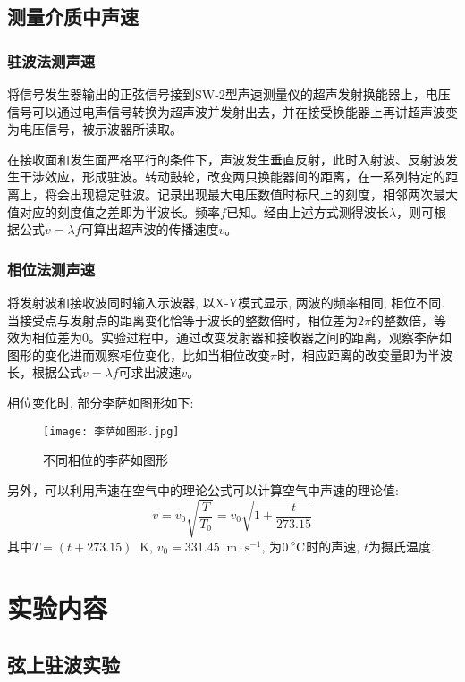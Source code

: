 \documentclass[11pt]{article}
\newcommand*{\unit}[1]{\mathop{}\!\mathrm{#1}}
\newcommand*{\mcelsius}{\unit{\prescript{\circ}{}C}}
\begin{document}
\subsection{测量介质中声速}

\subsubsection{驻波法测声速}

将信号发生器输出的正弦信号接到SW-2型声速测量仪的超声发射换能器上，电压信号可以通过电声信号转换为超声波并发射出去，并在接受换能器上再讲超声波变为电压信号，被示波器所读取。

在接收面和发生面严格平行的条件下，声波发生垂直反射，此时入射波、反射波发生干涉效应，形成驻波。转动鼓轮，改变两只换能器间的距离，在一系列特定的距离上，将会出现稳定驻波。记录出现最大电压数值时标尺上的刻度，相邻两次最大值对应的刻度值之差即为半波长。频率$f$已知。经由上述方式测得波长$\lambda$，则可根据公式$v = \lambda f$可算出超声波的传播速度$v$。

\subsubsection{相位法测声速}

将发射波和接收波同时输入示波器, 以X-Y模式显示, 两波的频率相同, 相位不同. 当接受点与发射点的距离变化恰等于波长的整数倍时，相位差为$2\pi$的整数倍，等效为相位差为$0$。实验过程中，通过改变发射器和接收器之间的距离，观察李萨如图形的变化进而观察相位变化，比如当相位改变$\pi$时，相应距离的改变量即为半波长，根据公式$v = \lambda f$可求出波速$v$。

相位变化时, 部分李萨如图形如下: 

\begin{figure}[H]
    \centering
    \texttt{[image: 李萨如图形.jpg]}
    \caption{不同相位的李萨如图形}
\end{figure}

另外，可以利用声速在空气中的理论公式可以计算空气中声速的理论值: 
\[
    v = v_0 \sqrt{\frac{T}{T_0}} = v_0 \sqrt{1 + \frac{t}{273.15}}
\]
其中$T = (t+273.15) \unit{K}$, $v_0 = 331.45 \unit{m\cdot s^{-1}}$, 为$0 \mcelsius$时的声速, $t$为摄氏温度. 


\section{实验内容}

\subsection{弦上驻波实验}
\end{document}
